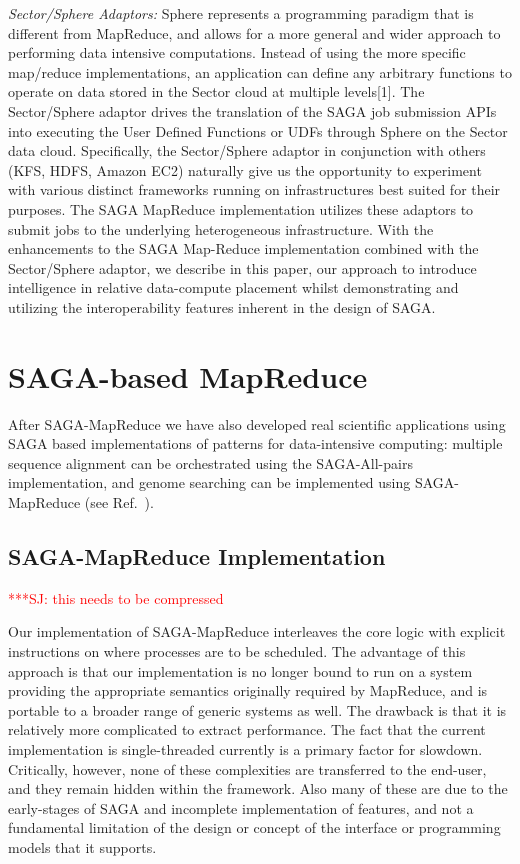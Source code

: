 \documentclass[3p,twocolumn]{elsarticle}
\newcommand{\jhanote}[1]{ {\textcolor{red} { ***SJ: #1 }}}
\newcommand{\jhanote}[1]{}
\newcommand{\sagamapreduce }{SAGA-MapReduce }
\newcommand{\upup}{\vspace*{-0.6em}}
\begin{document}
{\it Sector/Sphere Adaptors: }Sphere represents a programming paradigm
that is different from MapReduce, and allows for a more general and
wider approach to performing data intensive computations. Instead of
using the more specific map/reduce implementations, an application can
define any arbitrary functions to operate on data stored in the Sector
cloud at multiple levels[1]. The Sector/Sphere adaptor drives the
translation of the SAGA job submission APIs into executing the User
Defined Functions or UDFs through Sphere on the Sector data cloud.
Specifically, the Sector/Sphere adaptor in conjunction with others
(KFS, HDFS, Amazon EC2) naturally give us the opportunity to
experiment with various distinct frameworks running on infrastructures
best suited for their purposes. The SAGA MapReduce implementation
utilizes these adaptors to submit jobs to the underlying heterogeneous
infrastructure. With the enhancements to the SAGA Map-Reduce
implementation combined with the Sector/Sphere adaptor, we describe in
this paper, our approach to introduce intelligence in relative
data-compute placement whilst demonstrating and utilizing the
interoperability features inherent in the design of SAGA.

\section{SAGA-based MapReduce}
After \sagamapreduce we have also developed real scientific
applications using SAGA based implementations of patterns for
data-intensive computing: multiple sequence alignment can be
orchestrated using the SAGA-All-pairs implementation, and genome
searching can be implemented using SAGA-MapReduce (see
Ref.~\cite{saga_ccgrid09}).


\upup
\subsection{\sagamapreduce Implementation}


\jhanote{this needs to be compressed}

Our implementation of \sagamapreduce interleaves the core logic with
explicit instructions on where processes are to be scheduled.  The
advantage of this approach is that our implementation is no longer
bound to run on a system providing the appropriate semantics
originally required by MapReduce, and is portable to a broader range
of generic systems as well.  The drawback is that it is relatively
more complicated to extract performance.%
The fact that the current implementation is single-threaded
currently is a primary factor for slowdown.  Critically, however, none
of these complexities are transferred to the end-user, and they remain
hidden within the framework. Also many of these are due to the
early-stages of SAGA and incomplete implementation of features, and
not a fundamental limitation of the design or concept of the interface
or programming models that it supports.
\end{document}
